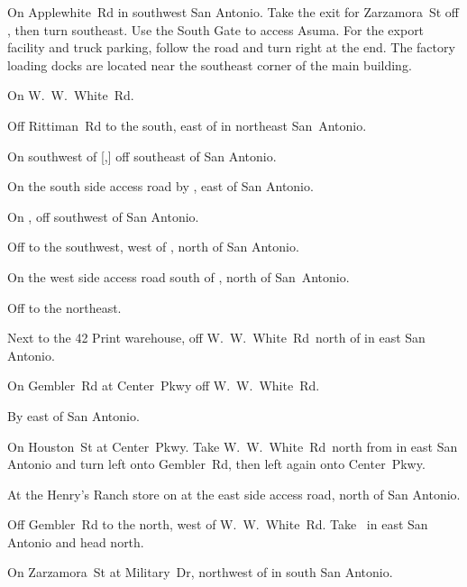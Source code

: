 
\newcommand*{\WWWhiteRd}{W\!.~W\!.~White~Rd}

\begin{LocationList}

On Applewhite~Rd in southwest San Antonio.
Take the exit for Zarzamora~St off , then turn southeast.
Use the South Gate to access Asuma.
For the export facility and truck parking, follow the road and turn right at the end.
The factory loading docks are located near the southeast corner of the main building.

\Location{\GarageHQ \Garage}
On  \WWWhiteRd.

Off Rittiman~Rd to the south, east of  in northeast San~Antonio.

On  southwest of [,] off  southeast of San Antonio.

On the south side  access road by , east of San Antonio.

On , off  southwest of San Antonio.

Off  to the southwest, west of , north of San Antonio.

On the west side  access road south of , north of San~Antonio.

Off   to the northeast.

Next to the 42 Print warehouse, off  \WWWhiteRd\ north of   in east San Antonio.

\Location{\RecruitmentAgency \Recruitment}
On Gembler~Rd at Center~Pkwy off  \WWWhiteRd.

\Location{\TruckStop \Gas \Rest \Service \Weigh}
By   east of San Antonio.

On Houston~St at Center~Pkwy.
Take  \WWWhiteRd\ north from   in east San Antonio and turn left onto Gembler~Rd, then left again onto Center~Pkwy.

At the Henry's Ranch store on  at the east side  access road, north of San Antonio.

Off Gembler~Rd to the north, west of  \WWWhiteRd.
Take~  in east San Antonio and head north.

On Zarzamora~St at  Military~Dr, northwest of   in south San Antonio.

\end{LocationList}
